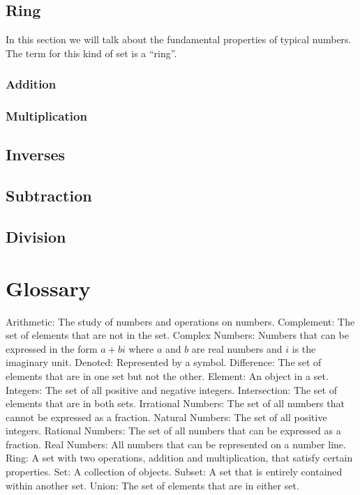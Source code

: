 \section{Ring}
In this section we will talk about the fundamental properties of typical numbers.
The term for this kind of set is a ``ring''.
\subsection{Addition}
\subsection{Multiplication}
\section{Inverses}
\section{Subtraction}
\section{Division}



\chapter{Glossary}
Arithmetic: The study of numbers and operations on numbers.
Complement: The set of elements that are not in the set.
Complex Numbers: Numbers that can be expressed in the form $a + bi$ where $a$ and $b$ are real numbers and $i$ is the imaginary unit.
Denoted: Represented by a symbol.
Difference: The set of elements that are in one set but not the other.
Element: An object in a set.
Integers: The set of all positive and negative integers.
Intersection: The set of elements that are in both sets.
Irrational Numbers: The set of all numbers that cannot be expressed as a fraction.
Natural Numbers: The set of all positive integers.
Rational Numbers: The set of all numbers that can be expressed as a fraction.
Real Numbers: All numbers that can be represented on a number line.
Ring: A set with two operations, addition and multiplication, that satisfy certain properties.
Set: A collection of objects.
Subset: A set that is entirely contained within another set.
Union: The set of elements that are in either set.
